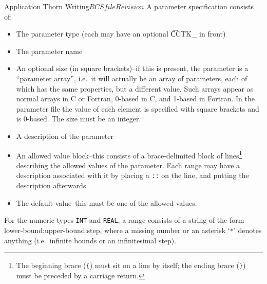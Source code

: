 \begin{cactuspart}{Application Thorn Writing}{$RCSfile$}{$Revision$}
A parameter specification consists of:
\begin{itemize}

\item The parameter type (each may have an optional {\t CCTK\_} in front)

\item The parameter name

\item An optional size (in square brackets)--if this is present, the
  parameter is a ``parameter array'', i.e.\ it will actually be an array
  of parameters, each of which has the same properties, but a different
  value.  Such arrays appear as normal arrays in C or Fortran, 0-based
  in C, and 1-based in Fortran.  In the parameter file the value of
  each element is specified with square brackets and is 0-based.  The
  size must be an integer.

\item A description of the parameter

\item An allowed value block--this consists of a brace-delimited
block of lines\footnote{The beginning brace (\texttt{\{}) must sit on a line by
itself; the ending brace (\texttt{\}}) must be preceded by a carriage return.}
describing the allowed values of the parameter.  Each range may have a
description associated with it by placing a \texttt{::} on the line, and putting
the description afterwards.

\item The default value--this must be one of the allowed values.

\end{itemize}

For the numeric types \texttt{INT} and \texttt{REAL}, a range consists
of a string of the
form lower-bound:upper-bound:step, where a missing number or an asterisk
`\texttt{*}' denotes anything (i.e.\ infinite bounds or an infinitesimal step).


\end{cactuspart}
